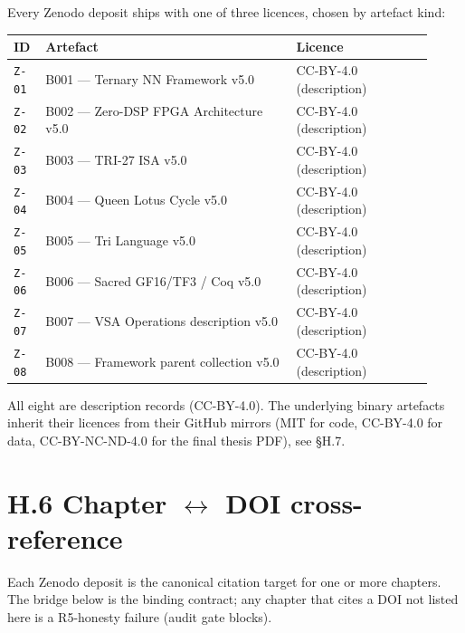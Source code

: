 \noindent Every Zenodo deposit ships with one of three licences, chosen by
artefact kind:

\begin{small}
\begin{longtable}{@{}p{0.07\linewidth}p{0.55\linewidth}p{0.30\linewidth}@{}}
\toprule
\textbf{ID} & \textbf{Artefact} & \textbf{Licence} \\
\midrule
\endhead
\texttt{Z-01} & B001 --- Ternary NN Framework v5.0                & CC-BY-4.0 (description) \\
\texttt{Z-02} & B002 --- Zero-DSP FPGA Architecture v5.0          & CC-BY-4.0 (description) \\
\texttt{Z-03} & B003 --- TRI-27 ISA v5.0                          & CC-BY-4.0 (description) \\
\texttt{Z-04} & B004 --- Queen Lotus Cycle v5.0                   & CC-BY-4.0 (description) \\
\texttt{Z-05} & B005 --- Tri Language v5.0                        & CC-BY-4.0 (description) \\
\texttt{Z-06} & B006 --- Sacred GF16/TF3 / Coq v5.0               & CC-BY-4.0 (description) \\
\texttt{Z-07} & B007 --- VSA Operations description v5.0          & CC-BY-4.0 (description) \\
\texttt{Z-08} & B008 --- Framework parent collection v5.0         & CC-BY-4.0 (description) \\
\bottomrule
\end{longtable}
\end{small}

\noindent All eight are description records (CC-BY-4.0). The underlying
binary artefacts inherit their licences from their GitHub mirrors
(MIT for code, CC-BY-4.0 for data, CC-BY-NC-ND-4.0 for the final thesis
PDF), see \S H.7.

\section*{H.6 Chapter $\leftrightarrow$ DOI cross-reference}

\noindent Each Zenodo deposit is the canonical citation target for one or
more chapters. The bridge below is the binding contract; any chapter that
cites a DOI not listed here is a R5-honesty failure (audit gate blocks).

